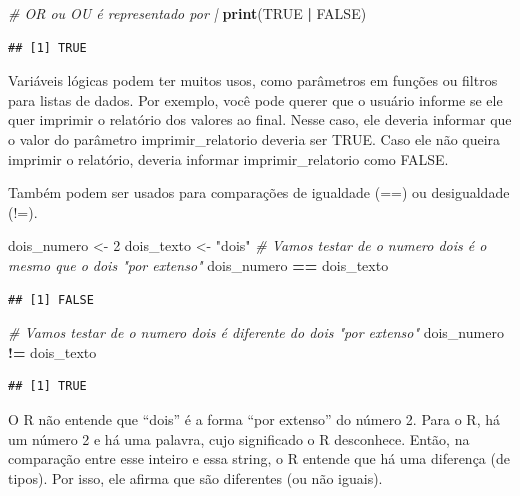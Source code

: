 \documentclass[
]{book}
\newenvironment{Shaded}{\begin{snugshade}}{\end{snugshade}}
\newcommand{\CommentTok}[1]{\textcolor[rgb]{0.56,0.35,0.01}{\textit{#1}}}
\newcommand{\DecValTok}[1]{\textcolor[rgb]{0.00,0.00,0.81}{#1}}
\newcommand{\KeywordTok}[1]{\textcolor[rgb]{0.13,0.29,0.53}{\textbf{#1}}}
\newcommand{\NormalTok}[1]{#1}
\newcommand{\OperatorTok}[1]{\textcolor[rgb]{0.81,0.36,0.00}{\textbf{#1}}}
\newcommand{\OtherTok}[1]{\textcolor[rgb]{0.56,0.35,0.01}{#1}}
\newcommand{\StringTok}[1]{\textcolor[rgb]{0.31,0.60,0.02}{#1}}
\begin{document}
\begin{Shaded}
\begin{Highlighting}[]
\CommentTok{# OR ou OU é representado por |}
\KeywordTok{print}\NormalTok{(}\OtherTok{TRUE} \OperatorTok{|}\StringTok{ }\OtherTok{FALSE}\NormalTok{) }
\end{Highlighting}
\end{Shaded}

\begin{verbatim}
## [1] TRUE
\end{verbatim}

Variáveis lógicas podem ter muitos usos, como parâmetros em funções ou filtros para listas de dados. Por exemplo, você pode querer que o usuário informe se ele quer imprimir o relatório dos valores ao final. Nesse caso, ele deveria informar que o valor do parâmetro imprimir\_relatorio deveria ser TRUE. Caso ele não queira imprimir o relatório, deveria informar imprimir\_relatorio como FALSE.

Também podem ser usados para comparações de igualdade (==) ou desigualdade (!=).

\begin{Shaded}
\begin{Highlighting}[]
\NormalTok{dois_numero <-}\StringTok{ }\DecValTok{2}
\NormalTok{dois_texto <-}\StringTok{ "dois"}
\CommentTok{# Vamos testar de o numero dois é o mesmo que o dois "por extenso"}
\NormalTok{dois_numero }\OperatorTok{==}\StringTok{ }\NormalTok{dois_texto}
\end{Highlighting}
\end{Shaded}

\begin{verbatim}
## [1] FALSE
\end{verbatim}

\begin{Shaded}
\begin{Highlighting}[]
\CommentTok{# Vamos testar de o numero dois é diferente do dois "por extenso"}
\NormalTok{dois_numero }\OperatorTok{!=}\StringTok{ }\NormalTok{dois_texto}
\end{Highlighting}
\end{Shaded}

\begin{verbatim}
## [1] TRUE
\end{verbatim}

O R não entende que ``dois'' é a forma ``por extenso'' do número 2. Para o R, há um número 2 e há uma palavra, cujo significado o R desconhece. Então, na comparação entre esse inteiro e essa string, o R entende que há uma diferença (de tipos). Por isso, ele afirma que são diferentes (ou não iguais).
\end{document}
